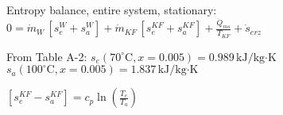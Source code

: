 Entropy balance, entire system, stationary:  
\( 0 = \dot{m}_W \, [s_e^W + s_a^W] + \dot{m}_{KF} \, [s_e^{KF} + s_a^{KF}] + \frac{\dot{Q}_{ms}}{T_{KF}} + \dot{s}_{erz} \)  

From Table A-2:  
\( s_e (70^\circ \text{C}, x = 0.005) = 0.989 \, \text{kJ/kg·K} \)  
\( s_a (100^\circ \text{C}, x = 0.005) = 1.837 \, \text{kJ/kg·K} \)  

\( [s_e^{KF} - s_a^{KF}] = c_p \ln \left( \frac{T_e}{T_a} \right) \)